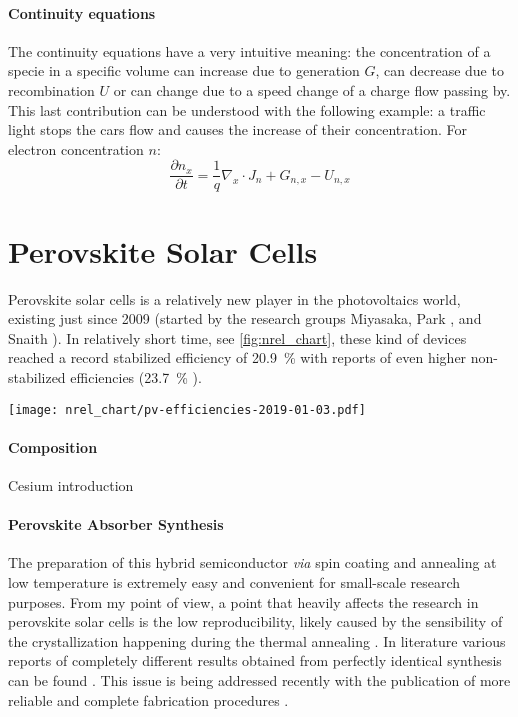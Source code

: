 		\paragraph{Continuity equations} The continuity equations have a very intuitive meaning: the concentration of a specie in a specific volume can increase due to generation $G$, can decrease due to recombination $U$ or can change due to a speed change of a charge flow passing by.
		This last contribution can be understood with the following example: a traffic light stops the cars flow and causes the increase of their concentration.
		For electron concentration $n$:
		$$\frac{\partial n_x}{\partial t} = \frac{1}{q}\nabla_x \cdot J_n + G_{n,x} - U_{n,x}$$

\section{Perovskite Solar Cells}

	Perovskite solar cells is a relatively new player in the photovoltaics world, existing just since 2009 (started by the research groups Miyasaka\cite{Kojima2009}, Park \cite{Im2011a,Kim2012b}, and Snaith \cite{Lee2012}).
	In relatively short time, see \cref{fig:nrel_chart}, these kind of devices reached a record stabilized efficiency of 20.9~\% \cite{Green2019} with reports of even higher non-stabilized efficiencies (23.7~\% \cite{Green2019,Jiang2017}).


	\begin{SCfigure}
		\centering
		\texttt{[image: nrel\_chart/pv-efficiencies-2019-01-03.pdf]}
		\label{fig:nrel_chart}
	\end{SCfigure}

\paragraph{Composition}

Cesium introduction \cite{Bi2016,Saliba2016}



	\paragraph{Perovskite Absorber Synthesis}
	The preparation of this hybrid semiconductor \textit{via} spin coating and annealing at low temperature is extremely easy and convenient for small-scale research purposes.
	From my point of view, a point that heavily affects the research in perovskite solar cells is the low reproducibility, likely caused by the sensibility of the crystallization happening during the thermal annealing \cite{Pockett2015}.
	In literature various reports of completely different results obtained from perfectly identical synthesis can be found \cite{Pockett2015,Gottesman2014}.
	This issue is being addressed recently with the publication of more reliable and complete fabrication procedures \cite{Saliba2018}.

